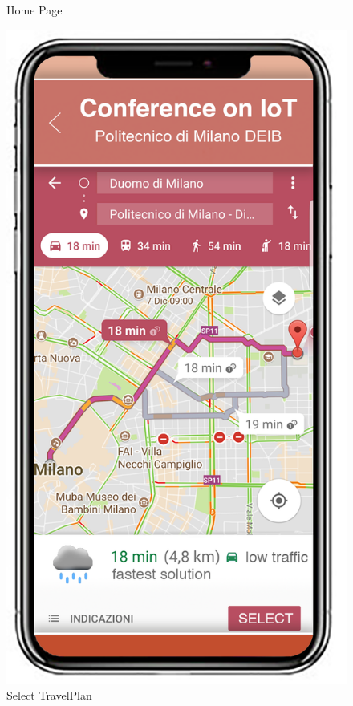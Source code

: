 \begin{figure}[H]
\begin{minipage}{0.33\textwidth}
				\caption{Home Page}
			\end{minipage}
			\begin{minipage}{0.33\textwidth}
				\centerline{\includegraphics[scale=0.4]{Images/SelectTravelPlan}}
				\caption{Select TravelPlan}
			\end{minipage}
			\begin{minipage}{0.33\textwidth}

\end{minipage}
\end{figure}
